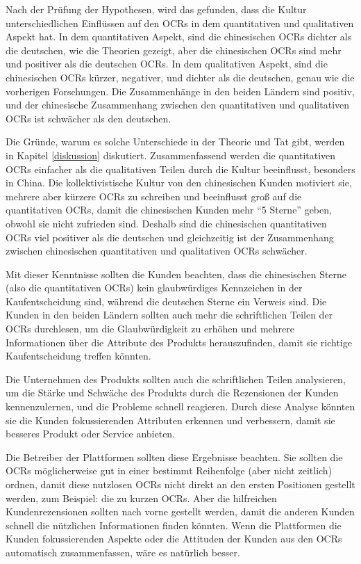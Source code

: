 Nach der Prüfung der Hypothesen, wird das gefunden, dass die Kultur unterschiedlichen Einflüssen auf den \ac{OCRs} in dem quantitativen und qualitativen Aspekt hat. In dem quantitativen Aspekt, sind die chinesischen \ac{OCRs} dichter als die deutschen, wie die Theorien gezeigt, aber die chinesischen \ac{OCRs} sind mehr und positiver als die deutschen \ac{OCRs}. In dem qualitativen Aspekt, sind die chinesischen \ac{OCRs} kürzer, negativer, und dichter als die deutschen, genau wie die vorherigen Forschungen. Die Zusammenhänge in den beiden Ländern sind positiv, und der chinesische Zusammenhang zwischen den quantitativen und qualitativen \ac{OCRs} ist schwächer als den deutschen.

Die Gründe, warum es solche Unterschiede in der Theorie und Tat gibt, werden in Kapitel \ref{diskussion} diskutiert. Zusammenfassend werden die quantitativen \ac{OCRs} einfacher als die qualitativen Teilen durch die Kultur beeinflusst, besonders in China. Die kollektivistische Kultur von den chinesischen Kunden motiviert sie, mehrere aber kürzere \ac{OCRs} zu schreiben und beeinflusst groß auf die quantitativen \ac{OCRs}, damit die chinesischen Kunden mehr ``5 Sterne'' geben, obwohl sie nicht zufrieden sind. Deshalb sind die chinesischen quantitativen \ac{OCRs} viel positiver als die deutschen und gleichzeitig ist der Zusammenhang zwischen chinesischen quantitativen und qualitativen \ac{OCRs} schwächer. 

Mit dieser Kenntnisse sollten die Kunden beachten, dass die chinesischen Sterne (also die quantitativen \ac{OCRs}) kein glaubwürdiges Kennzeichen in der Kaufentscheidung sind, während die deutschen Sterne ein Verweis sind. Die Kunden in den beiden Ländern sollten auch mehr die schriftlichen Teilen der \ac{OCRs} durchlesen, um die Glaubwürdigkeit zu erhöhen und mehrere Informationen über die Attribute des Produkts herauszufinden, damit sie richtige Kaufentscheidung treffen könnten.

Die Unternehmen des Produkts sollten auch die schriftlichen Teilen analysieren, um die Stärke und Schwäche des Produkts durch die Rezensionen der Kunden kennenzulernen, und die Probleme schnell reagieren. Durch diese Analyse könnten sie die Kunden fokussierenden Attributen erkennen und verbessern, damit sie besseres Produkt oder Service anbieten.

Die Betreiber der Plattformen sollten diese Ergebnisse beachten. Sie sollten die \ac{OCRs} möglicherweise gut in einer bestimmt Reihenfolge (aber nicht zeitlich) ordnen, damit diese nutzlosen \ac{OCRs} nicht direkt an den ersten Positionen gestellt werden, zum Beispiel: die zu kurzen \ac{OCRs}. Aber die hilfreichen Kundenrezensionen sollten nach vorne gestellt werden, damit die anderen Kunden schnell die nützlichen Informationen finden könnten. Wenn die Plattformen die Kunden fokussierenden Aspekte oder die Attituden der Kunden aus den \ac{OCRs} automatisch zusammenfassen, wäre es natürlich besser.
